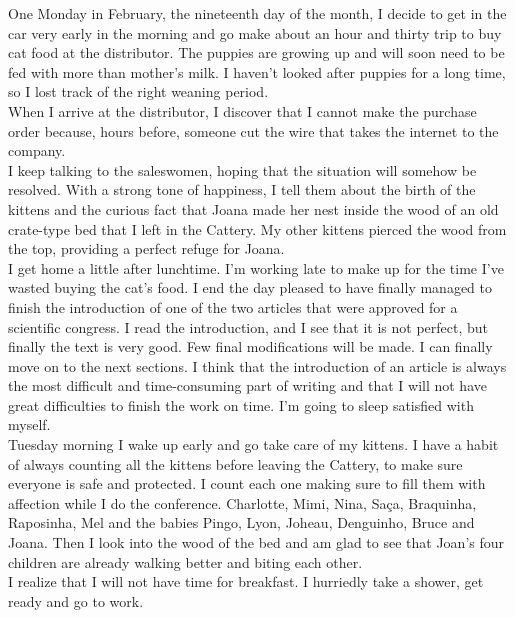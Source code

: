 \documentclass[11pt]{book}
\begin{document}
\noindent One Monday in February, the nineteenth day of the month, I decide to get in the car very early in the morning and go make about an hour and thirty trip to buy cat food at the distributor. The puppies are growing up and will soon need to be fed with more than mother's milk. I haven't looked after puppies for a long time, so I lost track of the right weaning period. \\

\noindent When I arrive at the distributor, I discover that I cannot make the purchase order because, hours before, someone cut the wire that takes the internet to the company. \\

\noindent I keep talking to the saleswomen, hoping that the situation will somehow be resolved. With a strong tone of happiness, I tell them about the birth of the kittens and the curious fact that Joana made her nest inside the wood of an old crate-type bed that I left in the Cattery. My other kittens pierced the wood from the top, providing a perfect refuge for Joana. \\

\noindent I get home a little after lunchtime. I'm working late to make up for the time I've wasted buying the cat's food. I end the day pleased to have finally managed to finish the introduction of one of the two articles that were approved for a scientific congress. I read the introduction, and I see that it is not perfect, but finally the text is very good. Few final modifications will be made. I can finally move on to the next sections. I think that the introduction of an article is always the most difficult and time-consuming part of writing and that I will not have great difficulties to finish the work on time. I'm going to sleep satisfied with myself. \\

\noindent Tuesday morning I wake up early and go take care of my kittens. I have a habit of always counting all the kittens before leaving the Cattery, to make sure everyone is safe and protected. I count each one making sure to fill them with affection while I do the conference. Charlotte, Mimi, Nina, Saça, Braquinha, Raposinha, Mel and the babies Pingo, Lyon, Joheau, Denguinho, Bruce and Joana. Then I look into the wood of the bed and am glad to see that Joan's four children are already walking better and biting each other. \\

\noindent I realize that I will not have time for breakfast. I hurriedly take a shower, get ready and go to work. \\
\end{document}
